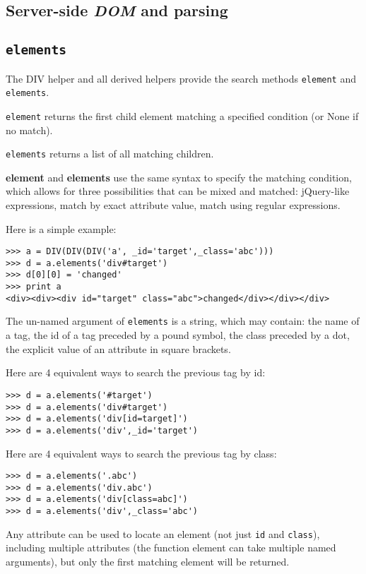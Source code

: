 \documentclass[justified,sixbynine,notoc]{tufte-book}
\def\ft{\small\tt}
\def\inxx#1{\index{#1}}
\begin{document}
\begin{fullwidth}
\goodbreak\section{Server-side {\it DOM} and parsing}

\inxx{element} \inxx{elements}

\goodbreak\subsection{{\ft elements}}

The DIV helper and all derived helpers provide the search methods {\ft element} and {\ft elements}.

{\ft element} returns the first child element matching a specified condition (or None if no match).

{\ft elements} returns a list of all matching children.

{\bf element} and {\bf elements} use the same syntax to specify the matching condition, which allows for three possibilities that can be mixed and matched: jQuery-like expressions, match by exact attribute value, match using regular expressions.

Here is a simple example:
\begin{lstlisting}
>>> a = DIV(DIV(DIV('a', _id='target',_class='abc')))
>>> d = a.elements('div#target')
>>> d[0][0] = 'changed'
>>> print a
<div><div><div id="target" class="abc">changed</div></div></div>
\end{lstlisting}

The un-named argument of {\ft elements} is a string, which may contain: the name of a tag, the id of a tag preceded by a pound symbol, the class preceded by a dot, the explicit value of an attribute in square brackets.

Here are 4 equivalent ways to search the previous tag by id:
\begin{lstlisting}
>>> d = a.elements('#target')
>>> d = a.elements('div#target')
>>> d = a.elements('div[id=target]')
>>> d = a.elements('div',_id='target')
\end{lstlisting}

Here are 4 equivalent ways to search the previous tag by class:
\begin{lstlisting}
>>> d = a.elements('.abc')
>>> d = a.elements('div.abc')
>>> d = a.elements('div[class=abc]')
>>> d = a.elements('div',_class='abc')
\end{lstlisting}

Any attribute can be used to locate an element (not just {\ft id} and {\ft class}), including multiple attributes (the function element can take multiple named arguments), but only the first matching element will be returned.


\end{fullwidth}
\end{document}
